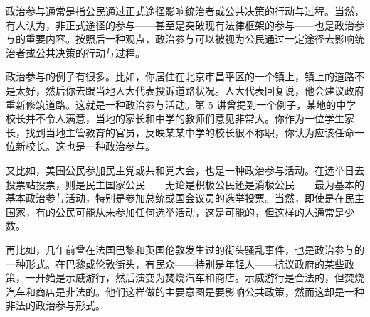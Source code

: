 





政治参与通常是指公民通过正式途径影响统治者或公共决策的行动与过程。当然，有人认为，非正式途径的参与——甚至是突破现有法律框架的参与——也是政治参与的重要内容。按照后一种观点，政治参与可以被视为公民通过一定途径去影响统治者或公共决策的行动与过程。

政治参与的例子有很多。比如，你居住在北京市昌平区的一个镇上，镇上的道路不是太好，然后你去跟当地人大代表投诉道路状况。人大代表回复说，他会建议政府重新修筑道路。这就是一种政治参与活动。第 5 讲曾提到一个例子，某地的中学校长并不令人满意，当地的家长和中学的教师们意见非常大。你作为一位学生家长，找到当地主管教育的官员，反映某某中学的校长很不称职，你认为应该任命一位新校长。这也是一种政治参与。

又比如，美国公民参加民主党或共和党大会，也是一种政治参与活动。在选举日去投票站投票，则是民主国家公民——无论是积极公民还是消极公民——最为基本的基本政治参与活动，特别是参加总统或国会议员的选举投票。当然，即使是在民主国家，有的公民可能从未参加任何选举活动，这是可能的，但这样的人通常是少数。

再比如，几年前曾在法国巴黎和英国伦敦发生过的街头骚乱事件，也是政治参与的一种形式。在巴黎或伦敦街头，有民众——特别是年轻人——抗议政府的某些政策，一开始是示威游行，然后演变为焚烧汽车和商店。示威游行是合法的，但焚烧汽车和商店是非法的。他们这样做的主要意图是要影响公共政策，然而这却是一种非法的政治参与形式。

